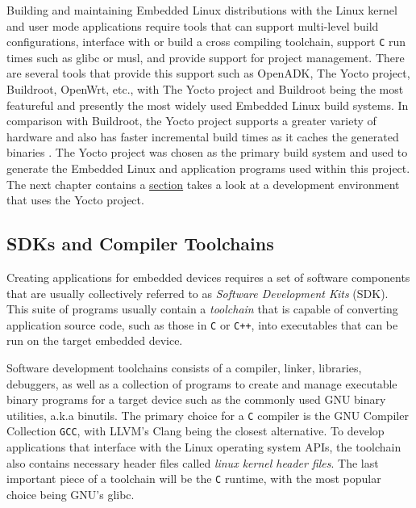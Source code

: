 Building and maintaining Embedded Linux distributions with the Linux kernel and user mode applications require tools that can support multi-level build configurations, interface with or build a cross compiling toolchain, support \texttt{C} run times such as glibc or musl, and provide support for project management. There are several tools that provide this support such as OpenADK, The Yocto project, Buildroot, OpenWrt, etc., with The Yocto project and Buildroot being the most featureful and presently the most widely used Embedded Linux build systems. In comparison with Buildroot, the Yocto project supports a greater variety of hardware and also has faster incremental build times as it caches the generated binaries \cite{yocto}. The Yocto project was chosen as the primary build system and used to generate the Embedded Linux and application programs used within this project. The next chapter contains a \hyperref[section:yocto-demo]{section} takes a look at a development environment that uses the Yocto project.


\subsection{SDKs and Compiler Toolchains}

Creating applications for embedded devices requires a set of software components that are usually collectively referred to as \textit{Software Development Kits} (SDK). This suite of programs usually contain a \textit{toolchain} that is capable of converting application source code, such as those in \texttt{C}  or \texttt{C++}, into executables that can be run on the target embedded device.

Software development toolchains consists of a compiler, linker, libraries, debuggers, as well as a collection of programs to create and manage executable binary programs for a target device such as the commonly used GNU binary utilities, a.k.a binutils. The primary choice for a \texttt{C} compiler is the GNU Compiler Collection \texttt{GCC}, with LLVM's Clang being the closest alternative. To develop applications that interface with the Linux operating system APIs, the toolchain also contains necessary header files called \textit{linux kernel header files}. The last important piece of a toolchain will be the \texttt{C} runtime, with the most popular choice being GNU's glibc.

